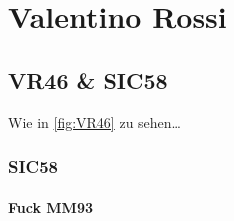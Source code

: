 \chapter{Valentino Rossi}

\section{VR46 \& SIC58}

Wie in \autoref{fig:VR46} zu sehen\dots


\subsection{SIC58}

\subsubsection{Fuck MM93}
